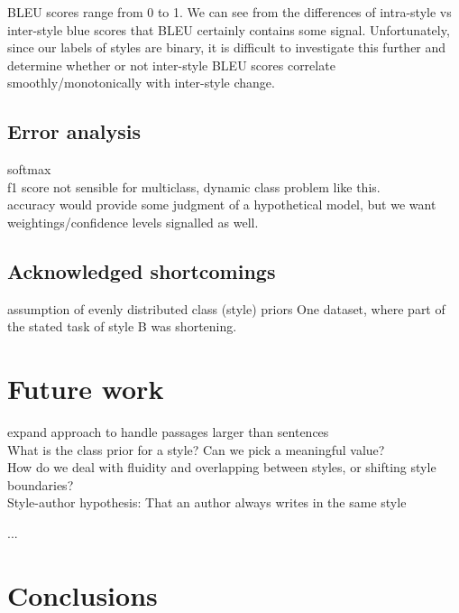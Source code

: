 \documentclass[letterpaper, 10 pt, conference]{ieeeconf}  %
\begin{document}
  BLEU scores range from 0 to 1. We can see from the differences of intra-style vs inter-style blue scores that BLEU certainly contains some signal. Unfortunately, since our labels of styles are binary, it is difficult to investigate this further and determine whether or not inter-style BLEU scores correlate smoothly/monotonically with inter-style change.

  \subsection{Error analysis}
      softmax\\
      f1 score not sensible for multiclass, dynamic class problem like this.\\
      accuracy would provide some judgment of a hypothetical model, but we want weightings/confidence levels signalled as well.
  \subsection{Acknowledged shortcomings}
  assumption of evenly distributed class (style) priors
One dataset, where part of the stated task of style B was shortening.

\section{Future work}
expand approach to handle passages larger than sentences\\
What is the class prior for a style? Can we pick a meaningful value?\\
How do we deal with fluidity and overlapping between styles, or shifting style boundaries?\\
Style-author hypothesis:
  That an author always writes in the same style


...
\section{Conclusions}



\addtolength{\textheight}{-12cm}   %
\end{document}
